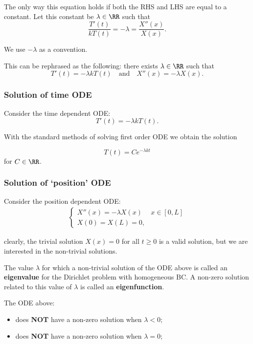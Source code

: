 \documentclass[12pt, a4paper]{article}
\begin{document}
The only way this equation holds if both the RHS and LHS are equal to a constant. Let this constant be \(\lambda \in \RR\) such that 
\[\frac{T'(t)}{kT(t)} = -\lambda = \frac{X''(x)}{X(x)}.\]

\begin{mdnote}
    We use \(-\lambda\) as a convention.
\end{mdnote}

This can be rephrased as the following: there exists \(\lambda \in \RR\) such that 
\[T'(t)= -\lambda k T(t) \quad \text{and} \quad X''(x)=-\lambda X(x).\]

\subsubsection{Solution of time ODE}

Consider the time dependent ODE:
\[T'(t)=-\lambda k T(t).\]

With the standard methods of solving first order ODE we obtain the solution 

\[T(t) = Ce^{-\lambda k t}\]
for \(C \in \RR\).

\subsubsection{Solution of `position' ODE}

Consider the position dependent ODE:
\[\begin{aligned}
    \begin{cases}
        X''(x)= -\lambda X(x) & x\in[0,L] \\
        X(0)=X(L)=0,
    \end{cases}
\end{aligned}\]

clearly, the trivial solution \(X(x)=0\) for all \(t\geq 0\) is a valid solution, but we are interested in the non-trivial solutions.

\begin{definition}
    The value \(\lambda\) for which a non-trivial solution of the ODE above is called an \textbf{eigenvalue} for the Dirichlet problem with homogeneous BC. A non-zero solution related to this value of \(\lambda\) is called an \textbf{eigenfunction}.
\end{definition}

\begin{mdthm}
    The ODE above: 
    \begin{itemize}
        \item does \textbf{NOT} have a non-zero solution when \(\lambda<0\);
        \item does \textbf{NOT} have a non-zero solution when \(\lambda=0\);
    \end{itemize}
\end{mdthm}
\end{document}

